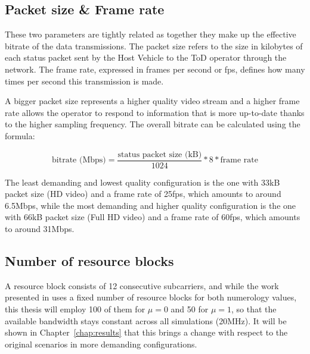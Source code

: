 \subsection{Packet size \& Frame rate}
These two parameters are tightly related as together they make up the effective bitrate of the data transmissions.
The packet size refers to the size in kilobytes of each status packet sent by the Host Vehicle to the ToD operator through the network.
The frame rate, expressed in frames per second or fps, defines how many times per second this transmission is made.

A bigger packet size represents a higher quality video stream and a higher frame rate allows the operator to respond to information that is more up-to-date thanks to the higher sampling frequency.
The overall bitrate can be calculated using the formula:

$$\text{bitrate (Mbps)} = \frac{\text{status packet size (kB)}}{1024} * 8 * \text{frame rate}$$

The least demanding and lowest quality configuration is the one with 33kB packet size (HD video) and a frame rate of 25fps, which amounts to around 6.5Mbps, while the most demanding and higher quality configuration is the one with 66kB packet size (Full HD video) and a frame rate of 60fps, which amounts to around 31Mbps.

\subsection{Number of resource blocks}

A resource block consists of 12 consecutive subcarriers, and while the work presented in \cite{valeriopaper} uses a fixed number of resource blocks for both numerology values, this thesis will employ 100 of them for $\mu=0$ and 50 for $\mu=1$, so that the available bandwidth stays constant across all simulations (20MHz). It will be shown in Chapter~\ref{chap:results} that this brings a change with respect to the original scenarios in more demanding configurations.


